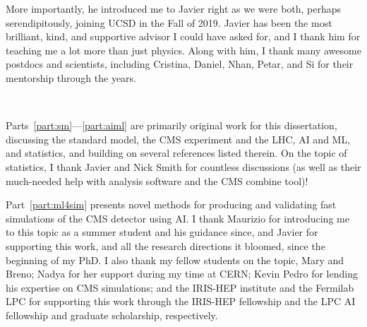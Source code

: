 \begin{acknowledgements}
More importantly, he introduced me to Javier right as we were both, perhaps serendipitously, joining UCSD in the Fall of 2019.
Javier has been the most brilliant, kind, and supportive advisor I could have asked for, and I thank him for teaching me a lot more than just physics.
Along with him, I thank many awesome postdocs and scientists, including Cristina, Daniel, Nhan, Petar, and Si for their mentorship through the years.




\

Parts~\ref{part:sm}---\ref{part:aiml} are primarily original work for this dissertation, discussing the standard model, the CMS experiment and the LHC, AI and ML, and statistics, and building on several references listed therein.
On the topic of statistics, I thank Javier and Nick Smith for countless discussions (as well as their much-needed help with analysis software and the CMS combine tool)!

Part~\ref{part:ml4sim} presents novel methods for producing and validating fast simulations of the CMS detector using AI.
I thank Maurizio for introducing me to this topic as a summer student and his guidance since, and Javier for supporting this work, and all the research directions it bloomed, since the beginning of my PhD.
I also thank my fellow students on the topic, Mary and Breno; Nadya for her support during my time at CERN; Kevin Pedro for lending his expertise on CMS simulations; and the IRIS-HEP institute and the Fermilab LPC for supporting this work through the IRIS-HEP fellowship and the LPC AI fellowship and graduate scholarship, respectively.


\end{acknowledgements}
